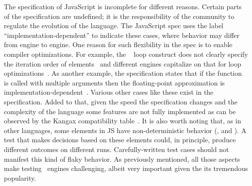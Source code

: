\documentclass[smallextended]{svjour3}
\begin{document}
The specification of JavaScript is incomplete for different
reasons. Certain parts of the specification are undefined; it is the
responsibility of the community to regulate the evolution of the
language. The JavaScript spec uses the label
``implementation-dependent'' to indicate these cases, where behavior
may differ from engine to engine. One reason for such flexibility in
the spec is to enable compiler optimizations. For example, the
\js\  loop construct does not clearly specify the
iteration order of
elements~\cite{so-forin-undefined,javascript-in-chrome} and different
engines capitalize on that for loop
optimizations~\cite{for-in-undefined}.  As another example, the
specification states that if the 
function is called with multiple arguments then the floating-point
approximation is
implementation-dependent~\cite{es6-toPrecision}. Various other cases
like these exist in the specification. Added to that, given the speed
the specification changes and the complexity of the language some
features are not fully implemented as can be observed by the Kangax
compatibility table~\cite{kangax}.  It is also worth noting that, as
in other languages, some elements in JS have non-deterministic
behavior (\eg{},  and ). A test
that makes decisions based on these elements could, in principle,
produce different outcomes on different runs. Carefully-written test
cases should not manifest this kind of flaky behavior.  As previously
mentioned, all those aspects make testing \js\ engines challenging,
albeit very important given the its tremendous popularity.





\end{document}

